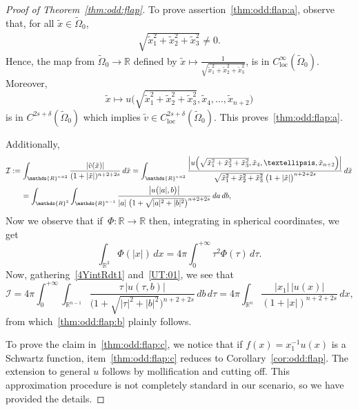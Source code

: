 \documentclass[a4paper,12pt,reqno]{amsart}
\numberwithin{equation}{section}
\theoremstyle{definition}
\theoremstyle{notation}
\newcommand{\R}{\mathds{R}}
\begin{document}
\begin{proof}[Proof of Theorem~\ref{thm:odd:flap}]
To prove assertion~\ref{thm:odd:flap:a}, observe that, for all $\tilde x \in \tilde \Omega_0$, \begin{align*}
\sqrt{\tilde x_1^2+\tilde x_2^2+\tilde x_3^2} %
\neq 0 .
\end{align*} Hence, the map from $\tilde \Omega_0 \to \R $ defined by $\tilde x \mapsto \frac 1 {\sqrt{\tilde x_1^2+\tilde x_2^2+\tilde x_3^2}}$, is in $C^\infty_{\mathrm{loc} } (\tilde \Omega_0)$. Moreover, %
\[
\tilde x \mapsto u\Big (\sqrt{\tilde{x}_1^2 + \tilde{x}_2^2 + \tilde{x}_3^2}, \tilde{x}_4, \ldots, \tilde{x}_{n + 2}\Big )
\]
is in $C^{2s+\delta}(\tilde \Omega_0)$ which implies $\tilde v\in C^{2s+\delta}_{\mathrm{loc}}(\tilde \Omega_0)$. This proves~\ref{thm:odd:flap:a}.


Additionally,
\begin{equation}\label{4YintRdt1}\begin{split}&{\mathcal{I}}:=
\int_{\R^{n+2}} \frac{|\tilde{v}(\tilde{x})|}{(1 + |\tilde{x}|)^{n + 2 + 2s} }\, d\tilde x=
\int_{\R^{n+2}}
\frac{ \Bigl|u\Bigl(\sqrt{\tilde{x}_1^2 + \tilde{x}_2^2 + \tilde{x}_3^2}, \tilde{x}_4, \ldots, \tilde{x}_{n + 2}\Bigr)\Bigr|}{\sqrt{\tilde{x}_1^2 + \tilde{x}_2^2 + \tilde{x}_3^2} \;\big(1 + |\tilde{x}|\big)^{n + 2 + 2s}} \,d\tilde x\\& \qquad
= \int_{\R^3} \int_{\R^{n-1}} \frac{ \bigl|u\bigl( |a|,b\bigr)\bigr|}{|a|\;\big(1 + \sqrt{|a|^2+|b|^2}\big)^{n + 2 + 2s}} \,da\, db
,\end{split}\end{equation}
Now we observe that if~$\Phi:\R\to\R$ then, integrating in spherical coordinates, we get
\begin{equation}\label{UT:01}
\int_{\R^3} \Phi(|x|)\,dx = 4\pi\int_0^{+\infty}\tau^2 \Phi(\tau) \,d\tau.
\end{equation}
Now, gathering~\eqref{4YintRdt1} and~\eqref{UT:01}, we see that
\[
{\mathcal{I}}
= {4\pi}\int_0^{+\infty} \int_{\R^{n-1}}\frac{\tau \, |u(\tau,b)|}{\big(1 + \sqrt{|\tau|^2+|b|^2}\big)^{n + 2 + 2s}}\, db\, d\tau 
= {4\pi}\int_{ \R^{n}} \frac{|x_1|\, |u(x)|}{ (1 + |x|)^{ n + 2 + 2s}}\, dx ,
\]
from which~\ref{thm:odd:flap:b} plainly follows.


To prove the claim in~\ref{thm:odd:flap:c}, we notice that if $f(x) = x_1^{-1} u(x)$ is a Schwartz function, item~\ref{thm:odd:flap:c} reduces to Corollary~\ref{cor:odd:flap}. The extension to general $u$ follows by mollification and cutting off. This approximation procedure is not completely standard in our scenario, so we have provided the details.



\end{proof}
\end{document}
